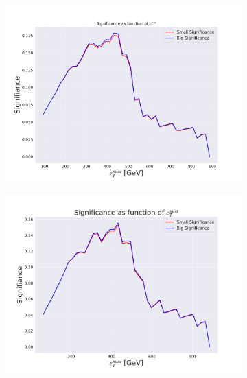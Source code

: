 \begin{figure}[H]
    \centering
    \begin{subfigure}{.45\textwidth}
        \includegraphics[width=\textwidth]{Figures/AE_testing/big/3lep/significance_etmiss_450p0p0300.pdf}
        \caption{ }
        \label{fig:AE_3lep_big_450_signi}
    \end{subfigure}
    \hfill
    \begin{subfigure}{.45\textwidth}
        \includegraphics[width=\textwidth]{Figures/AE_testing/small/3lep/significance_etmiss_450p0p0300.pdf}
        \caption{}
        \label{fig:AE_3lep_small_450_signi}
    \end{subfigure}
    \hfill
    \begin{subfigure}{.45\textwidth}

\end{subfigure}
\end{figure}
